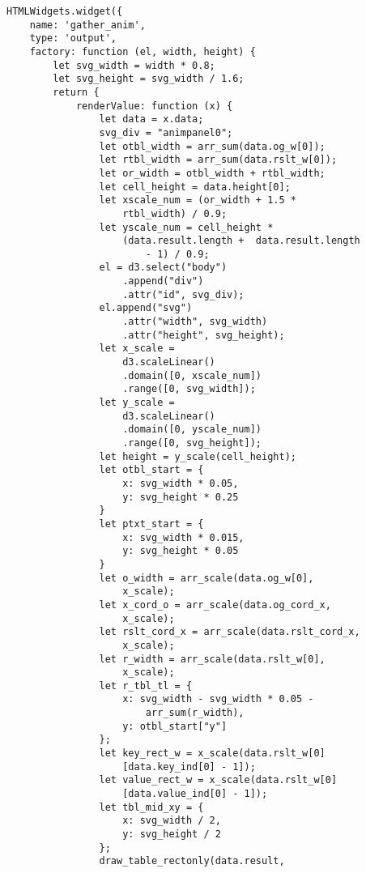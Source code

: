 \begin{lstlisting}
HTMLWidgets.widget({
    name: 'gather_anim',
    type: 'output',
    factory: function (el, width, height) {
        let svg_width = width * 0.8;
        let svg_height = svg_width / 1.6;
        return {
            renderValue: function (x) {
                let data = x.data;
                svg_div = "animpanel0";
                let otbl_width = arr_sum(data.og_w[0]);
                let rtbl_width = arr_sum(data.rslt_w[0]);
                let or_width = otbl_width + rtbl_width;
                let cell_height = data.height[0];
                let xscale_num = (or_width + 1.5 * 
                    rtbl_width) / 0.9;
                let yscale_num = cell_height * 
                    (data.result.length +  data.result.length 
                        - 1) / 0.9;
                el = d3.select("body")
                    .append("div")
                    .attr("id", svg_div);
                el.append("svg")
                    .attr("width", svg_width)
                    .attr("height", svg_height);
                let x_scale =
                    d3.scaleLinear()
                    .domain([0, xscale_num])
                    .range([0, svg_width]);
                let y_scale =
                    d3.scaleLinear()
                    .domain([0, yscale_num])
                    .range([0, svg_height]);
                let height = y_scale(cell_height);
                let otbl_start = {
                    x: svg_width * 0.05,
                    y: svg_height * 0.25
                }
                let ptxt_start = {
                    x: svg_width * 0.015,
                    y: svg_height * 0.05
                }
                let o_width = arr_scale(data.og_w[0], 
                    x_scale);
                let x_cord_o = arr_scale(data.og_cord_x, 
                    x_scale);
                let rslt_cord_x = arr_scale(data.rslt_cord_x, 
                    x_scale);
                let r_width = arr_scale(data.rslt_w[0], 
                    x_scale);
                let r_tbl_tl = {
                    x: svg_width - svg_width * 0.05 - 
                        arr_sum(r_width),
                    y: otbl_start["y"]
                };
                let key_rect_w = x_scale(data.rslt_w[0]
                    [data.key_ind[0] - 1]);
                let value_rect_w = x_scale(data.rslt_w[0]
                    [data.value_ind[0] - 1]);
                let tbl_mid_xy = {
                    x: svg_width / 2,
                    y: svg_height / 2
                };
                draw_table_rectonly(data.result, 

\end{lstlisting}
